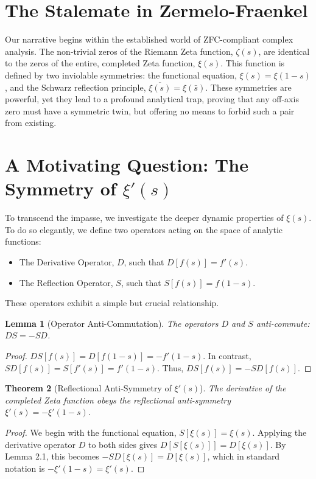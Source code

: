 \documentclass{article}
\theoremstyle{plain}
\newtheorem{theorem}{Theorem}[section]
\newtheorem{lemma}[theorem]{Lemma}
\theoremstyle{definition}
\theoremstyle{remark}
\begin{document}
\section{The Stalemate in Zermelo-Fraenkel}
\label{sec:stalemate}
Our narrative begins within the established world of ZFC-compliant complex analysis. The non-trivial zeros of the Riemann Zeta function, $\zeta(s)$, are identical to the zeros of the entire, completed Zeta function, $\xi(s)$. This function is defined by two inviolable symmetries: the functional equation, $\xi(s) = \xi(1-s)$, and the Schwarz reflection principle, $\overline{\xi(s)} = \xi(\bar{s})$. These symmetries are powerful, yet they lead to a profound analytical trap, proving that any off-axis zero must have a symmetric twin, but offering no means to forbid such a pair from existing.

\section{A Motivating Question: The Symmetry of \texorpdfstring{$\xi'(s)$}{xi'(s)}}
\label{sec:question}
To transcend the impasse, we investigate the deeper dynamic properties of $\xi(s)$. To do so elegantly, we define two operators acting on the space of analytic functions:
\begin{itemize}
    \item The Derivative Operator, $D$, such that $D[f(s)] = f'(s)$.
    \item The Reflection Operator, $S$, such that $S[f(s)] = f(1-s)$.
\end{itemize}
These operators exhibit a simple but crucial relationship.

\begin{lemma}[Operator Anti-Commutation]
The operators $D$ and $S$ anti-commute: $DS = -SD$.
\end{lemma}
\begin{proof}
$DS[f(s)] = D[f(1-s)] = -f'(1-s)$. In contrast, $SD[f(s)] = S[f'(s)] = f'(1-s)$. Thus, $DS[f(s)] = -SD[f(s)]$.
\end{proof}

\begin{theorem}[Reflectional Anti-Symmetry of $\xi'(s)$]
\label{thm:anti_symmetry}
The derivative of the completed Zeta function obeys the reflectional anti-symmetry $\xi'(s) = -\xi'(1-s)$.
\end{theorem}
\begin{proof}
We begin with the functional equation, $S[\xi(s)] = \xi(s)$. Applying the derivative operator $D$ to both sides gives $D[S[\xi(s)]] = D[\xi(s)]$. By Lemma 2.1, this becomes $-SD[\xi(s)] = D[\xi(s)]$, which in standard notation is $-\xi'(1-s) = \xi'(s)$.
\end{proof}
\end{document}
